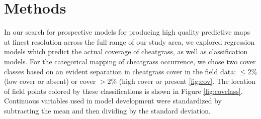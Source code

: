 \def\year{2017}\relax \documentclass[letterpaper]{article}
\begin{document}
\section{Methods}
In our search for prospective models for producing high quality predictive maps at finest resolution across the full range of our study area, we explored regression models which predict the actual coverage of cheatgrass, as well as classification models. For the categorical mapping of cheatgrass
occurrence, we chose two cover classes based on an evident separation in cheatgrass cover in the field
data: $≤ 2\%$ (low cover or absent) or cover $> 2\%$ (high cover or present \ref{fig:cov}. 
The location of field points colored by these classifications is shown in Figure \ref{fig:covclass}. Continuous variables used in model development were standardized by subtracting the mean and then dividing
by the standard deviation. 
\end{document}
